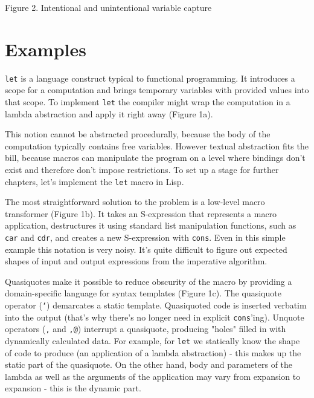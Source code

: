 \documentclass[10pt,journal,a4paper]{IEEEtran}
\begin{document}
\begin{figure*}
\hskip5.05cm
\normalsize Figure 2. Intentional and unintentional variable capture
\end{figure*}

\section{Examples}

\texttt{let} is a language construct typical to functional programming. It introduces
a scope for a computation and brings temporary variables with provided values into that scope.
To implement \texttt{let} the compiler might wrap the computation in a lambda abstraction
and apply it right away (Figure 1a).

This notion cannot be abstracted procedurally, because the body of the computation typically
contains free variables. However textual abstraction fits the bill, because macros can manipulate
the program on a level where bindings don't exist and therefore don't impose restrictions.
To set up a stage for further chapters, let's implement the \texttt{let} macro in Lisp.

The most straightforward solution to the problem is a low-level macro transformer (Figure 1b).
It takes an S-expression that represents a macro application, destructures it using standard
list manipulation functions, such as \texttt{car} and \texttt{cdr}, and creates a new S-expression
with \texttt{cons}. Even in this simple example this notation is very noisy. It's quite difficult
to figure out expected shapes of input and output expressions from the imperative algorithm.

Quasiquotes \cite{bawden99} make it possible to reduce obscurity of the macro by providing
a domain-specific language for syntax templates (Figure 1c). The quasiquote operator (\texttt{`})
demarcates a static template. Quasiquoted code is inserted verbatim into the output
(that's why there's no longer need in explicit \texttt{cons}'ing). Unquote operators (\texttt{,}
and \texttt{,@}) interrupt a quasiquote, producing "holes" filled in with dynamically calculated
data. For example, for \texttt{let} we statically know the shape of code to produce (an application
of a lambda abstraction) - this makes up the static part of the quasiquote. On the other hand,
body and parameters of the lambda as well as the arguments of the application may vary from
expansion to expansion - this is the dynamic part.
\end{document}
